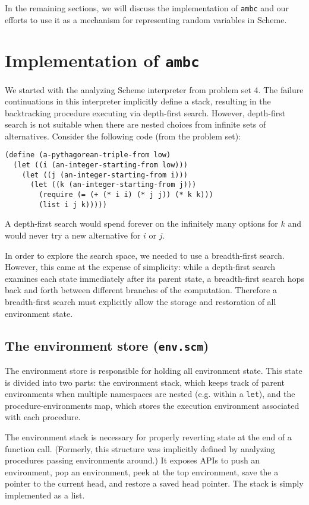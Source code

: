 \documentclass{article}
\begin{document}
In the remaining sections, we will discuss the implementation of
\texttt{ambc} and our efforts to use it as a mechanism for
representing random variables in Scheme.

\section{Implementation of \texttt{ambc}}

We started with the analyzing Scheme interpreter from problem set 4.
The failure continuations in this interpreter implicitly define a
stack, resulting in the backtracking procedure executing via
depth-first search.  However, depth-first search is not suitable when
there are nested choices from infinite sets of alternatives. Consider
the following code (from the problem set):
\begin{lstlisting}
(define (a-pythagorean-triple-from low)
  (let ((i (an-integer-starting-from low)))
    (let ((j (an-integer-starting-from i)))
      (let ((k (an-integer-starting-from j)))
        (require (= (+ (* i i) (* j j)) (* k k)))
        (list i j k)))))
\end{lstlisting}
A depth-first search would spend forever on the infinitely many
options for $k$ and would never try a new alternative for $i$ or $j$.

In order to explore the search space, we needed to use a breadth-first
search.  However, this came at the expense of simplicity: while a
depth-first search examines each state immediately after its parent
state, a breadth-first search hops back and forth between different
branches of the computation.  Therefore a breadth-first search must
explicitly allow the storage and restoration of all environment state.

\subsection{The environment store (\texttt{env.scm})}

The environment store is responsible for holding all environment
state.  This state is divided into two parts: the environment stack,
which keeps track of parent environments when multiple namespaces are
nested (e.g. within a \texttt{let}), and the procedure-environments
map, which stores the execution environment associated with each
procedure.

The environment stack is necessary for properly reverting state at the
end of a function call. (Formerly, this structure was implicitly
defined by analyzing procedures passing environments around.)  It
exposes APIs to push an environment, pop an environment, peek at the
top environment, save the a pointer to the current head, and restore
a saved head pointer.  The stack is simply implemented as a list.
\end{document}
